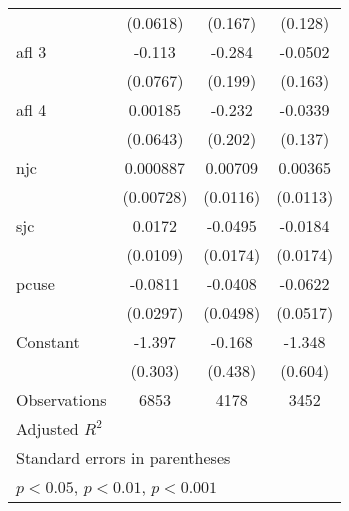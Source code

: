{\begin{tabular}{l*{3}{c}}
                    &    (0.0618)         &     (0.167)         &     (0.128)         \\
[1em]
afl 3               &      -0.113         &      -0.284         &     -0.0502         \\
                    &    (0.0767)         &     (0.199)         &     (0.163)         \\
[1em]
afl 4               &     0.00185         &      -0.232         &     -0.0339         \\
                    &    (0.0643)         &     (0.202)         &     (0.137)         \\
[1em]
njc                 &    0.000887         &     0.00709         &     0.00365         \\
                    &   (0.00728)         &    (0.0116)         &    (0.0113)         \\
[1em]
sjc                 &      0.0172         &     -0.0495\sym{**} &     -0.0184         \\
                    &    (0.0109)         &    (0.0174)         &    (0.0174)         \\
[1em]
pcuse               &     -0.0811\sym{**} &     -0.0408         &     -0.0622         \\
                    &    (0.0297)         &    (0.0498)         &    (0.0517)         \\
[1em]
Constant            &      -1.397\sym{***}&      -0.168         &      -1.348\sym{*}  \\
                    &     (0.303)         &     (0.438)         &     (0.604)         \\
\hline
Observations        &        6853         &        4178         &        3452         \\
Adjusted \(R^{2}\)  &                     &                     &                     \\
\hline\hline
\multicolumn{4}{l}{\footnotesize Standard errors in parentheses}\\
\multicolumn{4}{l}{\footnotesize \sym{*} \(p<0.05\), \sym{**} \(p<0.01\), \sym{***} \(p<0.001\)}\\
\end{tabular}
}
